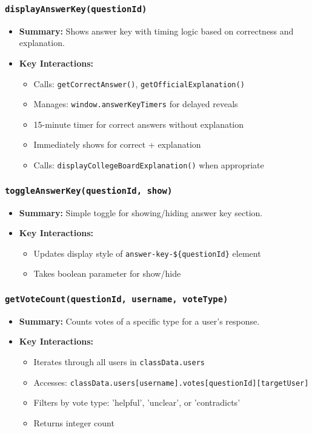 \documentclass[11pt,letterpaper]{article}
\begin{document}
\subsubsection{\texttt{displayAnswerKey(questionId)}}
\begin{itemize}
    \item \textbf{Summary:} Shows answer key with timing logic based on correctness and explanation.
    \item \textbf{Key Interactions:}
    \begin{itemize}
        \item Calls: \texttt{getCorrectAnswer()}, \texttt{getOfficialExplanation()}
        \item Manages: \texttt{window.answerKeyTimers} for delayed reveals
        \item 15-minute timer for correct answers without explanation
        \item Immediately shows for correct + explanation
        \item Calls: \texttt{displayCollegeBoardExplanation()} when appropriate
    \end{itemize}
\end{itemize}

\subsubsection{\texttt{toggleAnswerKey(questionId, show)}}
\begin{itemize}
    \item \textbf{Summary:} Simple toggle for showing/hiding answer key section.
    \item \textbf{Key Interactions:}
    \begin{itemize}
        \item Updates display style of \texttt{answer-key-\$\{questionId\}} element
        \item Takes boolean parameter for show/hide
    \end{itemize}
\end{itemize}

\subsubsection{\texttt{getVoteCount(questionId, username, voteType)}}
\begin{itemize}
    \item \textbf{Summary:} Counts votes of a specific type for a user's response.
    \item \textbf{Key Interactions:}
    \begin{itemize}
        \item Iterates through all users in \texttt{classData.users}
        \item Accesses: \texttt{classData.users[username].votes[questionId][targetUser]}
        \item Filters by vote type: 'helpful', 'unclear', or 'contradicts'
        \item Returns integer count
    \end{itemize}
\end{itemize}
\end{document}
